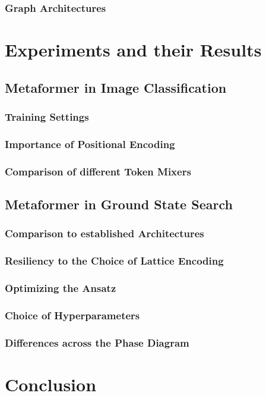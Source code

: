\documentclass[
headings=optiontohead,              %
12pt,                               %
DIV=13,                             %
twoside=false,                      %
open=right,                         %
BCOR=10mm,                          %
toc=bibliographynumbered            %
]{scrreport}
\begin{document}
        \subsection{Graph Architectures}
        \label{sec:architectures-biasesgraph}

\chapter{Experiments and their Results}
    \section{Metaformer in Image Classification}
        \subsection{Training Settings}
        \label{sec:experiments-trainingsettings}

        \subsection{Importance of Positional Encoding}
        \label{sec:experiments-positionalencoding}
        \subsection{Comparison of different Token Mixers}
        \label{sec:experiments-tokenmixers}

    \section{Metaformer in Ground State Search}
        \subsection{Comparison to established Architectures}
        \label{sec:experiments-comparisontoestablished}
        \subsection{Resiliency to the Choice of Lattice Encoding}
        \label{sec:experiments-resiliencylatticeencoding}
        \subsection{Optimizing the Ansatz}
        \label{sec:experiments-optimizingtheansatz}
        \subsection{Choice of Hyperparameters}
        \label{sec:experiments-hyperparameters}
        \subsection{Differences across the Phase Diagram}
        \label{sec:experiments-phasecriticalpoint}

\chapter{Conclusion}
\label{sec:conclusion}



\end{document}
